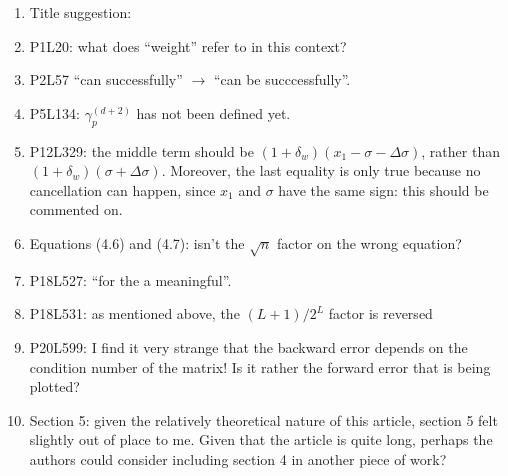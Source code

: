 \documentclass[10pt]{article}
\newcommand{\dd}{\delta}
\begin{document}
\begin{enumerate}
	\item Title suggestion:
	\item P1L20: what does ``weight'' refer to in this context?
	\item P2L57 ``can successfully'' $\rightarrow$ ``can be succcessfully''.
	\item P5L134: $\gamma_p^{(d+2)}$ has not been defined yet.
	\item P12L329: the middle term should be $(1+\dd_w)(x_1-\sigma-\Delta\sigma)$, rather than $(1+\dd_w)(\sigma+\Delta\sigma)$. Moreover, the last equality is only true because no cancellation can happen, since $x_1$ and $\sigma$ have the same sign: this should be commented on.
	\item Equations (4.6) and (4.7): isn't the $\sqrt{n}$ factor on the wrong equation?
	\item P18L527: ``for the a meaningful''.
	\item P18L531: as mentioned above, the $(L+1)/2^L$ factor is reversed
	\item P20L599: I find it very strange that the backward error depends on the condition number of the matrix! Is it rather the forward error that is being plotted?
	\item Section 5: given the relatively theoretical nature of this article, section 5 felt slightly out of place to me. Given that the article is quite long, perhaps the authors could consider including section 4 in another piece of work? 
	
\end{enumerate}


\end{document}
